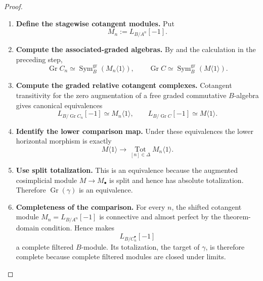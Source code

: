 \begin{proof}
\begin{enumerate}[label=\textup{(\arabic*)}]
\[\begin{tikzcd}[column sep=huge,row sep=large]
        \operatorname{Gr}L_{B/C_n^\bullet}[-1]
            \arrow[d,"\simeq"]
        \\
        L_{B/\operatorname{Gr}C}[-1]
            \arrow[r]
        &
        \displaystyle
        \operatorname*{Tot}_{[n]\in\Delta}
        L_{B/\operatorname{Gr}C_n}[-1].
    \end{tikzcd}
    \]
    \item \textbf{Define the stagewise cotangent modules.}
    Put
    \[
        M_n:=L_{B/A^n}[-1].
    \]
    \item \textbf{Compute the associated-graded algebras.}
    By  and the calculation in the preceding
    step,
    \[
        \operatorname{Gr}C_n
        \simeq
        \operatorname{Sym}^{\mathrm{gr}}_B(M_n\langle1\rangle),
        \qquad
        \operatorname{Gr}C
        \simeq
        \operatorname{Sym}^{\mathrm{gr}}_B(M\langle1\rangle).
    \]
    \item \textbf{Compute the graded relative cotangent complexes.}
    Cotangent transitivity for the zero augmentation of a free graded
    commutative \(B\)-algebra gives canonical equivalences
    \[
        L_{B/\operatorname{Gr}C_n}[-1]
        \simeq
        M_n\langle1\rangle,
        \qquad
        L_{B/\operatorname{Gr}C}[-1]
        \simeq
        M\langle1\rangle.
    \]
    \item \textbf{Identify the lower comparison map.}
    Under these equivalences the lower horizontal morphism is exactly
    \[
        M\langle1\rangle
        \longrightarrow
        \operatorname*{Tot}_{[n]\in\Delta}M_n\langle1\rangle.
    \]
    \item \textbf{Use split totalization.}
    This is an equivalence because the augmented cosimplicial module
    \(M\to M_\bullet\) is split and hence has absolute totalization. Therefore
    \(\operatorname{Gr}(\gamma)\) is an equivalence.
    \item \textbf{Completeness of the comparison.}
    For every \(n\), the shifted cotangent module
    \(M_n=L_{B/A^n}[-1]\) is connective and almost perfect by the theorem-domain
    condition. Hence  makes
    \[
        L_{B/C_n^\bullet}[-1]
    \]
    a complete filtered \(B\)-module. Its totalization, the target of
    \(\gamma\), is therefore complete because complete filtered modules are
    closed under limits.


\end{enumerate}
\end{proof}
